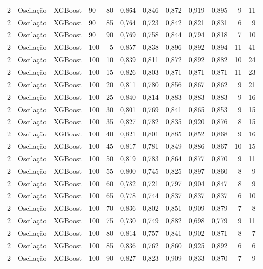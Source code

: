 \begin{longtable}{ccclrrrrrrrr}
2 & Oscilação & XGBoost & 90 & 80 & 0,864 & 0,846 & 0,872 & 0,919 & 0,895 & 9 & 11 \\
2 & Oscilação & XGBoost & 90 & 85 & 0,764 & 0,723 & 0,842 & 0,821 & 0,831 & 6 & 9 \\
2 & Oscilação & XGBoost & 90 & 90 & 0,769 & 0,758 & 0,844 & 0,794 & 0,818 & 7 & 10 \\
2 & Oscilação & XGBoost & 100 & 5 & 0,857 & 0,838 & 0,896 & 0,892 & 0,894 & 11 & 41 \\
2 & Oscilação & XGBoost & 100 & 10 & 0,839 & 0,811 & 0,872 & 0,892 & 0,882 & 10 & 24 \\
2 & Oscilação & XGBoost & 100 & 15 & 0,826 & 0,803 & 0,871 & 0,871 & 0,871 & 11 & 23 \\
2 & Oscilação & XGBoost & 100 & 20 & 0,811 & 0,780 & 0,856 & 0,867 & 0,862 & 9 & 21 \\
2 & Oscilação & XGBoost & 100 & 25 & 0,840 & 0,814 & 0,883 & 0,883 & 0,883 & 9 & 16 \\
2 & Oscilação & XGBoost & 100 & 30 & 0,801 & 0,769 & 0,841 & 0,865 & 0,853 & 9 & 15 \\
2 & Oscilação & XGBoost & 100 & 35 & 0,827 & 0,782 & 0,835 & 0,920 & 0,876 & 8 & 15 \\
2 & Oscilação & XGBoost & 100 & 40 & 0,821 & 0,801 & 0,885 & 0,852 & 0,868 & 9 & 16 \\
2 & Oscilação & XGBoost & 100 & 45 & 0,817 & 0,781 & 0,849 & 0,886 & 0,867 & 10 & 15 \\
2 & Oscilação & XGBoost & 100 & 50 & 0,819 & 0,783 & 0,864 & 0,877 & 0,870 & 9 & 11 \\
2 & Oscilação & XGBoost & 100 & 55 & 0,800 & 0,745 & 0,825 & 0,897 & 0,860 & 8 & 9 \\
2 & Oscilação & XGBoost & 100 & 60 & 0,782 & 0,721 & 0,797 & 0,904 & 0,847 & 8 & 9 \\
2 & Oscilação & XGBoost & 100 & 65 & 0,778 & 0,744 & 0,837 & 0,837 & 0,837 & 6 & 10 \\
2 & Oscilação & XGBoost & 100 & 70 & 0,836 & 0,802 & 0,851 & 0,909 & 0,879 & 7 & 8 \\
2 & Oscilação & XGBoost & 100 & 75 & 0,730 & 0,749 & 0,882 & 0,698 & 0,779 & 9 & 11 \\
2 & Oscilação & XGBoost & 100 & 80 & 0,814 & 0,757 & 0,841 & 0,902 & 0,871 & 8 & 7 \\
2 & Oscilação & XGBoost & 100 & 85 & 0,836 & 0,762 & 0,860 & 0,925 & 0,892 & 6 & 6 \\
2 & Oscilação & XGBoost & 100 & 90 & 0,827 & 0,823 & 0,909 & 0,833 & 0,870 & 7 & 9 \\

\end{longtable}
